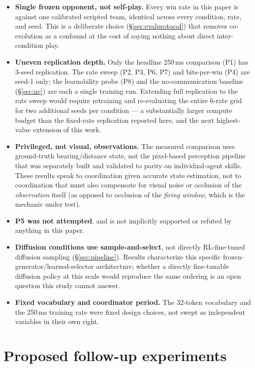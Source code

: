 \documentclass[11pt]{article}
\begin{document}
\begin{itemize}
\item \textbf{Single frozen opponent, not self-play.} Every win rate in
  this paper is against one calibrated scripted team, identical across
  every condition, rate, and seed. This is a deliberate choice
  (\S\ref{sec:evalprotocol}) that removes co-evolution as a confound at
  the cost of saying nothing about direct inter-condition play.
\item \textbf{Uneven replication depth.} Only the headline 250\,ms
  comparison (P1) has 3-seed replication. The rate sweep (P2, P3, P6,
  P7) and bits-per-win (P4) are seed-1 only; the learnability probe
  (P8) and the no-communication baseline (\S\ref{sec:nc}) are each a
  single training run. Extending full replication to the rate sweep
  would require retraining and re-evaluating the entire 6-rate grid for
  two additional seeds per condition --- a substantially larger compute
  budget than the fixed-rate replication reported here, and the next
  highest-value extension of this work.
\item \textbf{Privileged, not visual, observations.} The measured
  comparison uses ground-truth bearing/distance state, not the
  pixel-based perception pipeline that was separately built and
  validated to parity on individual-agent skills. These results speak
  to coordination given accurate state estimation, not to coordination
  that must also compensate for visual noise or occlusion of the
  \emph{observation} itself (as opposed to occlusion of the
  \emph{firing window}, which is the mechanic under test).
\item \textbf{P5 was not attempted}, and is not implicitly supported or
  refuted by anything in this paper.
\item \textbf{Diffusion conditions use sample-and-select}, not directly
  RL-fine-tuned diffusion sampling (\S\ref{sec:pipeline}). Results
  characterize this specific frozen-generator/learned-selector
  architecture; whether a directly fine-tunable diffusion policy at
  this scale would reproduce the same ordering is an open question this
  study cannot answer.
\item \textbf{Fixed vocabulary and coordinator period.} The 32-token
  vocabulary and the 250\,ms training rate were fixed design choices,
  not swept as independent variables in their own right.
\end{itemize}

\section{Proposed follow-up experiments}
\label{sec:future}
\end{document}
